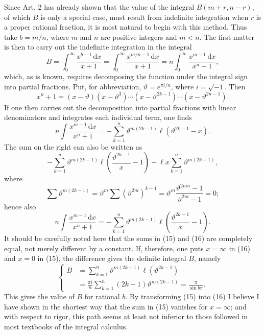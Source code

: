 \documentclass[11pt]{article}
\newcommand{\dd}{\,\mathrm d}
\begin{document}
Since Art. 2 has already shown that the value of the integral $B(m+r,n-r)$, of which $B$ is only a special case, must result from indefinite integration when $r$ is a proper rational fraction, it is most natural to begin with this method. Thus take $b=m/n$, where $m$ and $n$ are positive integers and $m<n$. The first matter is then to carry out the indefinite integration in the integral
\begin{equation}
B=\int_0^\infty \frac{x^{b-1}\dd x}{x+1}
=\int_0^\infty \frac{x^{m/n-1}\dd x}{x+1}
=n\int_0^\infty \frac{x^{m-1}\dd x}{x^n+1},
\tag{14}
\end{equation}
which, as is known, requires decomposing the function under the integral sign into partial fractions. Put, for abbreviation, $\vartheta=e^{\pi i/n}$, where $i=\sqrt{-1}$. Then
\[
x^n+1=(x-\vartheta)(x-\vartheta^3)\cdots(x-\vartheta^{2k-1})\cdots(x-\vartheta^{2n-1}).
\]
If one then carries out the decomposition into partial fractions with linear denominators and integrates each individual term, one finds
\begin{equation}
n\int \frac{x^{m-1}\dd x}{x^n+1}
=-\sum_{k=1}^n \vartheta^{m(2k-1)}\ell(\vartheta^{2k-1}-x).
\tag{15}
\end{equation}
The sum on the right can also be written as
\[
-\sum_{k=1}^n \vartheta^{m(2k-1)}\ell\left(\frac{\vartheta^{2k-1}}{x}-1\right)
-\ell x\sum_{k=1}^n\vartheta^{m(2k-1)},
\]
where
\[
\sum\vartheta^{m(2k-1)}=\vartheta^m\sum(\vartheta^{2m})^{k-1}
=\vartheta^m\frac{\vartheta^{2mn}-1}{\vartheta^{2m}-1}=0;
\]
hence also
\begin{equation}
n\int \frac{x^{m-1}\dd x}{x^n+1}
=-\sum_{k=1}^n\vartheta^{m(2k-1)}\ell\left(\frac{\vartheta^{2k-1}}{x}-1\right).
\tag{16}
\end{equation}
It should be carefully noted here that the sums in (15) and (16) are completely equal, not merely different by a constant. If, therefore, one puts $x=\infty$ in (16) and $x=0$ in (15), the difference gives the definite integral $B$, namely
\begin{equation}
\left\{
\begin{aligned}
B&=\sum_{k=1}^n\vartheta^{m(2k-1)}\ell(\vartheta^{2k-1})\\
&=\frac{\pi i}{n}\sum_{k=1}^n(2k-1)\vartheta^{m(2k-1)}=\frac{\pi}{\sin b\pi}.
\end{aligned}
\right.
\tag{17}
\end{equation}
This gives the value of $B$ for rational $b$. By transforming (15) into (16) I believe I have shown in the shortest way that the sum in (15) vanishes for $x=\infty$; and with respect to rigor, this path seems at least not inferior to those followed in most textbooks of the integral calculus.
\end{document}
